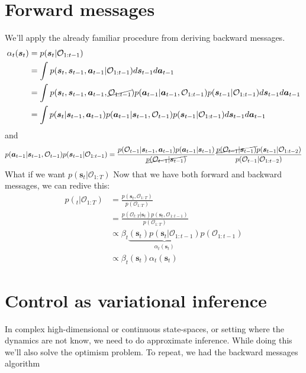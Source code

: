 \documentclass{report}
\begin{document}
\section{Forward messages}
We'll apply the already familiar procedure from deriving backward messages.
\begin{align}
\alpha_{ t } (\bm{s}_{t}) &= p (\bm{s}_{t}| \mathcal{O}_{ 1:t-1 }) \\
&= \int_{}^{} p (\bm{s}_{t}, \bm{s}_{t-1}, \bm{a}_{t-1}| \mathcal{O}_{ 1:t-1 }) d\bm{s}_{t-1} d\bm{a}_{t-1} \\
&= \int_{}^{} p (\bm{s}_{t}, \bm{s}_{t-1}, \bm{a}_{t-1}, \cancel{ \mathcal{O}_{ 1:t-1 }}) 
p(\bm{a}_{t-1}| \bm{a}_{t-1}, \mathcal{O}_{ 1:t-1 }) p (\bm{s}_{t-1}| \mathcal{O}_{ 1:t-1 })
d\bm{s}_{t-1} d\bm{a}_{t-1} \\
&= \int p (\bm{s}_{t}| \bm{s}_{t-1}, \bm{a}_{t-1}) p (\bm{a}_{t-1}| \bm{s}_{t-1}, \mathcal{O}_{ t-1 })
p (\bm{s}_{t-1}| \mathcal{O}_{ 1:t-1 })
d\bm{s}_{t-1} d\bm{a}_{t-1} \\
\end{align}
and
\begin{equation}
p (\bm{a}_{t-1}| \bm{s}_{t-1}, \mathcal{O}_{ t-1 })p (\bm{s}_{t-1}| \mathcal{O}_{ 1:t-1 }) =
\frac{p (\mathcal{O}_{ t-1 }|\bm{s}_{t-1}, \bm{a}_{t-1})p (\bm{a}_{t-1}| \bm{s}_{t-1} )}{\cancel{p (\mathcal{O}_{ t-1 }|\bm{s}_{t-1})}} 
\frac{\cancel{p (\mathcal{O}_{ t-1 }| \bm{s}_{t-1})} p (\bm{s}_{t-1}| \mathcal{O}_{ 1:t-2 })}{p (\mathcal{O}_{ t-1 }| \mathcal{O}_{ 1:t-2 })} 
\end{equation}
What if we want $ p (\bm{s}_{t}| \mathcal{O}_{ 1:T })  $
Now that we have both forward and backward messages, we can redive this:
\begin{align}
p (\bm{}_{t}| \mathcal{O}_{ 1:T }) &=
\frac{p (\bm{s}_{t}, \mathcal{O}_{ 1:T })}{p (\mathcal{O}_{ 1:T })} \\
&= \frac{p (\mathcal{O}_{ t:T }|\bm{s}_{t}) p (\bm{s}_{t}, \mathcal{O}_{ 1:t-1 })}{p (\mathcal{O}_{ 1:T })} \\
&\propto \beta_{ t } 
\underbrace{(\bm{s}_{t}) p (\bm{s}_{t}| \mathcal{O}_{ 1:t-1 }) }_{ \alpha_{ t } (\bm{s}_{t}) }
p (\mathcal{O}_{ 1:t-1 }) \\
&\propto \beta_{ t } (\bm{s}_{t}) \alpha_{ t } (\bm{s}_{t})
\end{align}

\section{Control as variational inference}
In complex high-dimensional or continuous state-spaces, or setting where the dynamics are
not know, we need to do approximate inference.
While doing this we'll also solve the optimism problem.
To repeat, we had the backward messages algorithm
\end{document}
